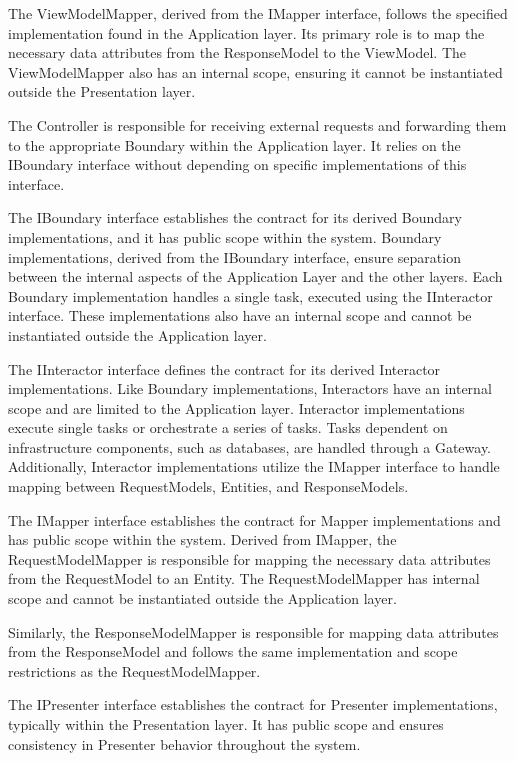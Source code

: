 The ViewModelMapper, derived from the IMapper interface, follows the specified
implementation found in the Application layer. Its primary role is to map the necessary
data attributes from the ResponseModel to the ViewModel. The ViewModelMapper also has an
internal scope, ensuring it cannot be instantiated outside the Presentation layer.

The Controller is responsible for receiving external requests and forwarding them to the
appropriate Boundary within the Application layer. It relies on the IBoundary interface
without depending on specific implementations of this interface.

The IBoundary interface establishes the contract for its derived Boundary implementations,
and it has public scope within the system. Boundary implementations, derived from the
IBoundary interface, ensure separation between the internal aspects of the Application
Layer and the other layers. Each Boundary implementation handles a single task, executed
using the IInteractor interface. These implementations also have an internal scope and
cannot be instantiated outside the Application layer.

The IInteractor interface defines the contract for its derived Interactor implementations.
Like Boundary implementations, Interactors have an internal scope and are limited to the
Application layer. Interactor implementations execute single tasks or orchestrate a series
of tasks. Tasks dependent on infrastructure components, such as databases, are handled
through a Gateway. Additionally, Interactor implementations utilize the IMapper interface
to handle mapping between RequestModels, Entities, and ResponseModels.

The IMapper interface establishes the contract for Mapper implementations and has public
scope within the system. Derived from IMapper, the RequestModelMapper is responsible for
mapping the necessary data attributes from the RequestModel to an Entity. The
RequestModelMapper has internal scope and cannot be instantiated outside the Application
layer.

Similarly, the ResponseModelMapper is responsible for mapping data attributes from the
ResponseModel and follows the same implementation and scope restrictions as the
RequestModelMapper.

The IPresenter interface establishes the contract for Presenter implementations, typically
within the Presentation layer. It has public scope and ensures consistency in Presenter
behavior throughout the system.

